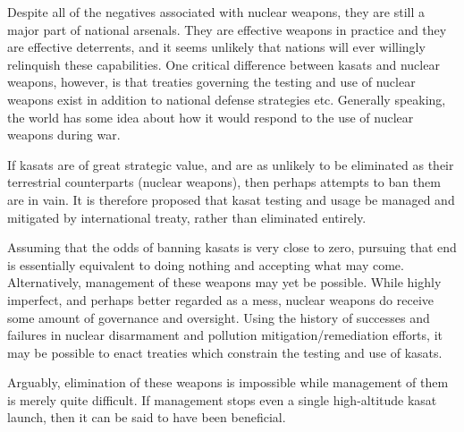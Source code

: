 Despite all of the negatives associated with nuclear weapons, they are
still a major part of national arsenals.  They are effective weapons
in practice\cite[hiroshima]{xxx} and they are effective
deterrents\cite[mad]{xxx}, and it seems unlikely that nations will
ever willingly relinquish these capabilities.  One critical difference
between \acp{kasat} and nuclear weapons, however, is that treaties
governing the testing and use of nuclear weapons exist in addition to
national defense strategies etc.  Generally speaking, the world has
some idea about how it would respond to the use of nuclear weapons
during war.  \cite[biden's statement]{xxx}

If \acp{kasat} are of great strategic value, and are as unlikely to be
eliminated as their terrestrial counterparts (nuclear weapons), then
perhaps attempts to ban them are in vain.  It is therefore proposed
that \ac{kasat} testing and usage be managed and mitigated by
international treaty, rather than eliminated entirely.

Assuming that the odds of banning \acp{kasat} is very close to zero,
pursuing that end is essentially equivalent to doing nothing and
accepting what may come.  Alternatively, management of these weapons
may yet be possible.  While highly imperfect, and perhaps better
regarded as a mess, nuclear weapons do receive some amount of
governance and oversight.  Using the history of successes and failures
in nuclear disarmament and pollution mitigation/remediation efforts,
it may be possible to enact treaties which constrain the testing and
use of \acp{kasat}.

Arguably, elimination of these weapons is impossible while management
of them is merely quite difficult.  If management stops even a single
high-altitude \ac{kasat} launch, then it can be said to have been
beneficial.
